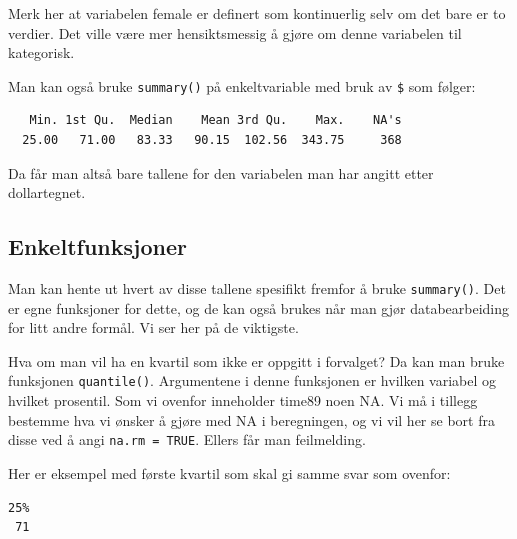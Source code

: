 \documentclass[
  norsk,
  letterpaper,
  DIV=11,
  numbers=noendperiod]{scrreprt}
\newenvironment{Shaded}{\begin{snugshade}}{\end{snugshade}}
\newcommand{\AttributeTok}[1]{\textcolor[rgb]{0.40,0.45,0.13}{#1}}
\newcommand{\ConstantTok}[1]{\textcolor[rgb]{0.56,0.35,0.01}{#1}}
\newcommand{\DecValTok}[1]{\textcolor[rgb]{0.68,0.00,0.00}{#1}}
\newcommand{\FunctionTok}[1]{\textcolor[rgb]{0.28,0.35,0.67}{#1}}
\newcommand{\NormalTok}[1]{\textcolor[rgb]{0.00,0.23,0.31}{#1}}
\newcommand{\SpecialCharTok}[1]{\textcolor[rgb]{0.37,0.37,0.37}{#1}}
\theoremstyle{definition}
\theoremstyle{remark}
\begin{document}
Merk her at variabelen female er definert som kontinuerlig selv om det
bare er to verdier. Det ville være mer hensiktsmessig å gjøre om denne
variabelen til kategorisk.

Man kan også bruke \texttt{summary()} på enkeltvariable med bruk av
\texttt{\$} som følger:

\begin{Shaded}
\end{Shaded}

\begin{verbatim}
   Min. 1st Qu.  Median    Mean 3rd Qu.    Max.    NA's 
  25.00   71.00   83.33   90.15  102.56  343.75     368 
\end{verbatim}

Da får man altså bare tallene for den variabelen man har angitt etter
dollartegnet.

\subsection{Enkeltfunksjoner}\label{enkeltfunksjoner}

Man kan hente ut hvert av disse tallene spesifikt fremfor å bruke
\texttt{summary()}. Det er egne funksjoner for dette, og de kan også
brukes når man gjør databearbeiding for litt andre formål. Vi ser her på
de viktigste.

Hva om man vil ha en kvartil som ikke er oppgitt i forvalget? Da kan man
bruke funksjonen \texttt{quantile()}. Argumentene i denne funksjonen er
hvilken variabel og hvilket prosentil. Som vi ovenfor inneholder time89
noen NA. Vi må i tillegg bestemme hva vi ønsker å gjøre med NA i
beregningen, og vi vil her se bort fra disse ved å angi
\texttt{na.rm\ =\ TRUE}. Ellers får man feilmelding.

Her er eksempel med første kvartil som skal gi samme svar som ovenfor:

\begin{Shaded}
\end{Shaded}

\begin{verbatim}
25% 
 71 
\end{verbatim}
\end{document}
